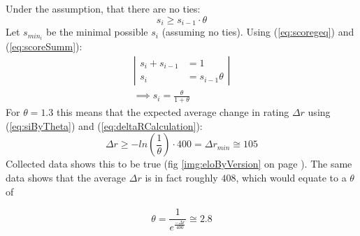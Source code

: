 \documentclass[12pt]{article}
\newcommand{\imgRef}[1]{(fig \ref{#1} on page \pageref{#1})}
\newcommand{\quckeq}[1]{(\ref{#1})}
\newcommand{\quickeq}[1]{\quckeq{#1}}
\newcommand{\FittedEloRaiting}{408}
\newcommand{\FittedScoringThreshold}{2.8}
\begin{document}
Under the assumption, that there are no ties:
\begin{equation}\label{eq:scoregeq}
s_i \geqslant s_{i-1} \cdot \theta
\end{equation}
Let \(s_{min_i}\) be the minimal possible \(s_i\) (assuming no ties). Using \quickeq{eq:scoregeq} and \quickeq{eq:scoreSumm}:
\begin{align}
\left|\begin{aligned}
s_i + s_{i-1} &= 1\\
s_i                 &= s_{i-1}\theta
\end{aligned}\right|\\
\implies s_i = \frac{\theta}{1+\theta}\label{eq:siByTheta}
\end{align}
For \(\theta = 1.3\) this means that the expected average change in rating \(\Delta r\) using \quickeq{eq:siByTheta} and \quickeq{eq:deltaRCalculation}:
\begin{equation}
\Delta r \geqslant -ln\left(\frac{1}{\theta}\right)\cdot 400 = \Delta r_{min} \cong 105
\end{equation}
Collected data shows this to be true \imgRef{img:eloByVersion}. The same data shows that the average \(\Delta r \) is in fact roughly \(\FittedEloRaiting\), which would equate to a \(\theta\) of

\begin{equation}
\theta = \frac{1}{e^{\frac{-\Delta r}{400}}} \cong \FittedScoringThreshold
\end{equation}
\begin{center}
	
	\captionsetup{width=.8\linewidth}
	\label{img:eloByVersion}
\end{center}

\newpage
\end{document}
